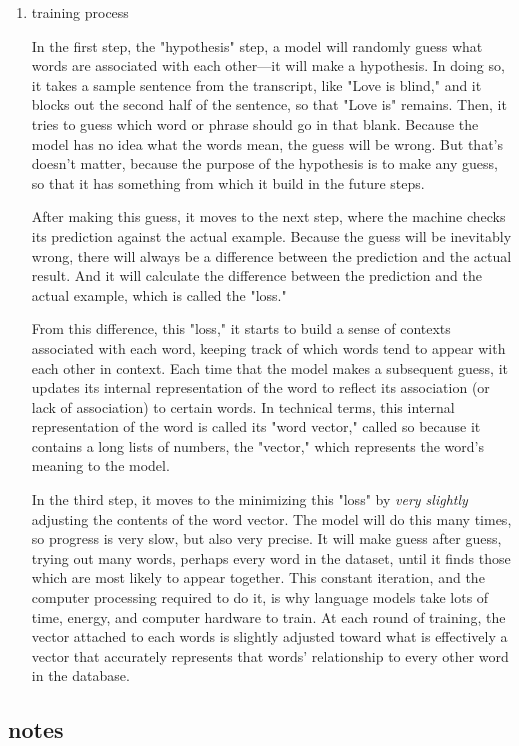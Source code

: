 \documentclass[11pt]{article}
\begin{document}
\begin{enumerate}
\item training process
\label{sec:org143c39b}

In the first step, the "hypothesis" step, a model will randomly guess
what words are associated with each other---it will make a hypothesis.
In doing so, it takes a sample sentence from the transcript, like
"Love is blind," and it blocks out the second half of the sentence, so
that "Love is" remains. Then, it tries to guess which word or phrase
should go in that blank. Because the model has no idea what the words
mean, the guess will be wrong. But that's doesn't matter, because the
purpose of the hypothesis is to make any guess, so that it has
something from which it build in the future steps.

After making this guess, it moves to the next step, where the machine
checks its prediction against the actual example. Because the guess
will be inevitably wrong, there will always be a difference between
the prediction and the actual result. And it will calculate the
difference between the prediction and the actual example, which is
called the "loss."

From this difference, this "loss," it starts to build a sense of
contexts associated with each word, keeping track of which words tend
to appear with each other in context. Each time that the model makes a
subsequent guess, it updates its internal representation of the word
to reflect its association (or lack of association) to certain words.
In technical terms, this internal representation of the word is called
its "word vector," called so because it contains a long lists of
numbers, the "vector," which represents the word's meaning to the
model.

In the third step, it moves to the minimizing this "loss" by \emph{very
slightly} adjusting the contents of the word vector. The model will do
this many times, so progress is very slow, but also very precise. It
will make guess after guess, trying out many words, perhaps every word
in the dataset, until it finds those which are most likely to appear
together. This constant iteration, and the computer processing
required to do it, is why language models take lots of time, energy,
and computer hardware to train. At each round of training, the vector
attached to each words is slightly adjusted toward what is effectively
a vector that accurately represents that words' relationship to every
other word in the database.
\end{enumerate}

\subsection{notes}
\label{sec:org432908a}
\end{document}
